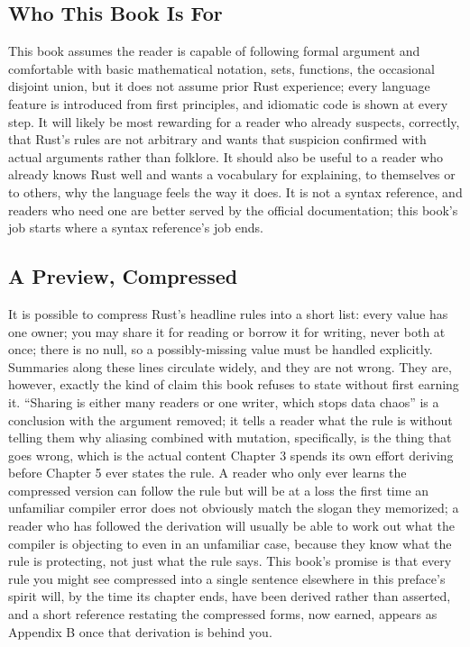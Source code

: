 \documentclass[11pt]{book}
\begin{document}
\subsection*{Who This Book Is For}

This book assumes the reader is capable of following formal argument and comfortable with basic mathematical notation, sets, functions, the occasional disjoint union, but it does not assume prior Rust experience; every language feature is introduced from first principles, and idiomatic code is shown at every step. It will likely be most rewarding for a reader who already suspects, correctly, that Rust's rules are not arbitrary and wants that suspicion confirmed with actual arguments rather than folklore. It should also be useful to a reader who already knows Rust well and wants a vocabulary for explaining, to themselves or to others, why the language feels the way it does. It is not a syntax reference, and readers who need one are better served by the official documentation; this book's job starts where a syntax reference's job ends.

\subsection*{A Preview, Compressed}

It is possible to compress Rust's headline rules into a short list: every value has one owner; you may share it for reading or borrow it for writing, never both at once; there is no null, so a possibly-missing value must be handled explicitly. Summaries along these lines circulate widely, and they are not wrong. They are, however, exactly the kind of claim this book refuses to state without first earning it. ``Sharing is either many readers or one writer, which stops data chaos'' is a conclusion with the argument removed; it tells a reader what the rule is without telling them why aliasing combined with mutation, specifically, is the thing that goes wrong, which is the actual content Chapter 3 spends its own effort deriving before Chapter 5 ever states the rule. A reader who only ever learns the compressed version can follow the rule but will be at a loss the first time an unfamiliar compiler error does not obviously match the slogan they memorized; a reader who has followed the derivation will usually be able to work out what the compiler is objecting to even in an unfamiliar case, because they know what the rule is protecting, not just what the rule says. This book's promise is that every rule you might see compressed into a single sentence elsewhere in this preface's spirit will, by the time its chapter ends, have been derived rather than asserted, and a short reference restating the compressed forms, now earned, appears as Appendix B once that derivation is behind you.
\end{document}
